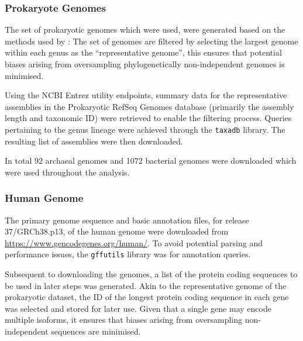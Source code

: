 \documentclass[../main.tex]{subfile}
\begin{document}
        \subsubsection{Prokaryote Genomes}
            The set of prokaryotic genomes which were used, were generated based on the methods used by \textcite{Ho2019}: The set of genomes are filtered by selecting the largest genome within each genus as the ``representative genome'', this ensures that potential biases arising from oversampling phylogenetically non-independent genomes is minimised.

            Using the NCBI Entrez utility endpoints, summary data for the representative assemblies in the Prokaryotic RefSeq Genomes database (primarily the assembly length and taxonomic ID) were retrieved to enable the filtering process. Queries pertaining to the genus lineage were achieved through the \texttt{taxadb} library. The resulting list of assemblies were then downloaded.

            In total 92 archaeal genomes and 1072 bacterial genomes were downloaded which were used throughout the analysis.
        \subsubsection{Human Genome}
            The primary genome sequence and basic annotation files, for release 37/GRCh38.p13, of the human genome were downloaded from \href{GENCODE}{https://www.gencodegenes.org/human/}. To avoid potential parsing and performance issues, the \texttt{gffutils} library was for annotation queries.

            Subsequent to downloading the genomes, a list of the protein coding sequences to be used in later steps was generated. Akin to the representative genome of the prokaryotic dataset, the ID of the longest protein coding sequence in each gene was selected and stored for later use. Given that a single gene may encode multiple isoforms, it ensures that biases arising from oversampling non-independent sequences are minimised.
\end{document}
